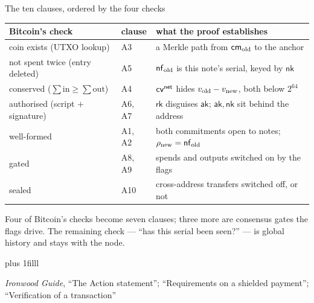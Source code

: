\documentclass[aspectratio=169,11pt]{beamer}
\newcommand{\cmsym}{\ensuremath{\mathsf{cm}}}
\newcommand{\rksym}{\ensuremath{\mathsf{rk}}}
\newcommand{\aksym}{\ensuremath{\mathsf{ak}}}
\newcommand{\nksym}{\ensuremath{\mathsf{nk}}}
\newcommand{\src}[1]{\par\vskip0pt plus 1filll
  {\fontsize{6}{7.2}\selectfont\color{arbdim}\raggedright #1\par}}
\begin{document}
\begin{frame}{The ten clauses, ordered by the four checks}
\begin{center}\small
\begin{tabular}{@{}llp{7.4cm}@{}}
\toprule
Bitcoin's check & clause & what the proof establishes \\
\midrule
coin exists (UTXO lookup) & A3 & a Merkle path from $\Eold{\cmsym}$ to
  the anchor \\
not spent twice (entry deleted) & A5 & $\mathsf{nf}_{\mathrm{old}}$ is this note's serial,
  keyed by $\nksym$ \\
conserved ($\sum\mathrm{in} \ge \sum\mathrm{out}$) & A4 & $\mathsf{cv}^{\mathsf{net}}$ hides
  $v_{\mathrm{old}} - v_{\mathrm{new}}$, both below $2^{64}$ \\
authorised (script $+$ signature) & A6, A7 & $\rksym$ disguises
  $\aksym$; $\aksym, \nksym$ sit behind the address \\
\addlinespace
well-formed & A1, A2 & both commitments open to notes;
  $\rho_{\mathrm{new}} = \mathsf{nf}_{\mathrm{old}}$ \\
gated & A8, A9 & spends and outputs switched on by the flags \\
sealed & A10 & cross-address transfers switched off, or not \\
\bottomrule
\end{tabular}
\end{center}
\medskip
\small Four of Bitcoin's checks become seven clauses; three more are
consensus gates the flags drive. The remaining check --- ``has this
serial been seen?'' --- is global history and stays with the node.
\src{\emph{Ironwood Guide}, ``The Action statement''; ``Requirements on a
  shielded payment''; ``Verification of a transaction''}
\end{frame}
\end{document}
